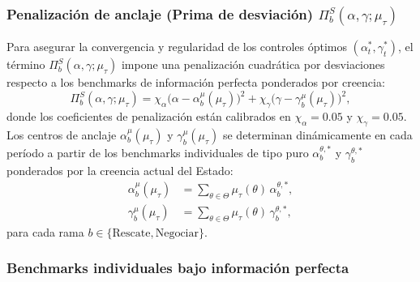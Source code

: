 \documentclass[ecta,nameyear,draft]{econsocart}
\begin{document}
\subsubsection*{Penalización de anclaje (Prima de desviación) $\Pi^S_b(\alpha,\gamma;\mu_\tau)$}

Para asegurar la convergencia y regularidad de los controles óptimos $(\alpha_t^\ast, \gamma_t^\ast)$, el término $\Pi^S_b(\alpha,\gamma;\mu_\tau)$ impone una penalización cuadrática por desviaciones respecto a los benchmarks de información perfecta ponderados por creencia:
\begin{equation}
\label{eq:anchoring-penalty}
\Pi^S_b(\alpha,\gamma;\mu_\tau) = \chi_\alpha \bigl(\alpha - \alpha_b^\mu(\mu_\tau)\bigr)^2 + \chi_\gamma \bigl(\gamma - \gamma_b^\mu(\mu_\tau)\bigr)^2,
\end{equation}
donde los coeficientes de penalización están calibrados en $\chi_\alpha = 0.05$ y $\chi_\gamma = 0.05$. Los centros de anclaje $\alpha_b^\mu(\mu_\tau)$ y $\gamma_b^\mu(\mu_\tau)$ se determinan dinámicamente en cada período a partir de los benchmarks individuales de tipo puro $\alpha_b^{\theta,\ast}$ y $\gamma_b^{\theta,\ast}$ ponderados por la creencia actual del Estado:
\begin{align}
\alpha_b^\mu(\mu_\tau) &= \sum_{\theta \in \Theta} \mu_\tau(\theta) \, \alpha_b^{\theta,\ast}, \\
\gamma_b^\mu(\mu_\tau) &= \sum_{\theta \in \Theta} \mu_\tau(\theta) \, \gamma_b^{\theta,\ast},
\end{align}
para cada rama $b \in \{\text{Rescate}, \text{Negociar}\}$.

\subsubsection*{Benchmarks individuales bajo información perfecta}
\end{document}
